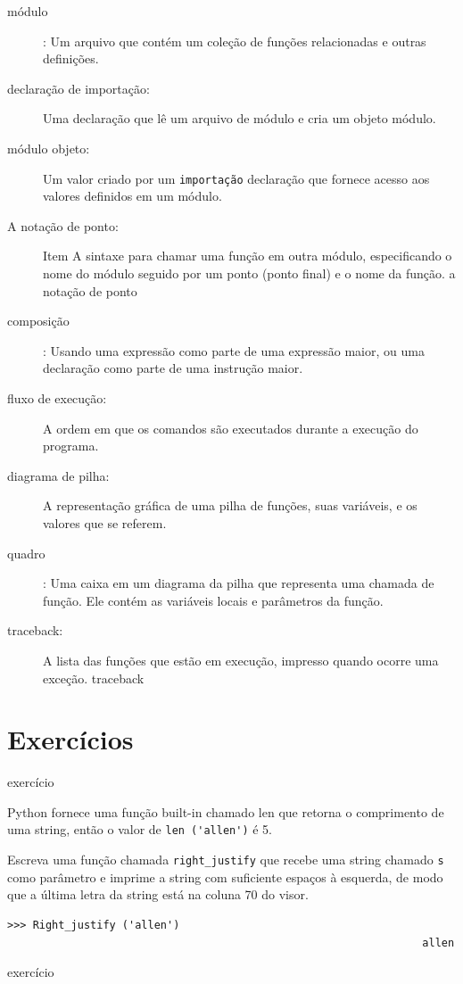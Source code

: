 \documentclass[10pt]{book}
\begin{document}
\begin{description}
\item[módulo]: Um arquivo que contém um
coleção de funções relacionadas e outras definições.

\item[declaração de importação:] Uma declaração que lê um arquivo de módulo e cria
um objeto módulo.

\item[módulo objeto:] Um valor criado por um {\tt importação} declaração
que fornece acesso aos valores definidos em um módulo.

\item[A notação de ponto:] Item A sintaxe para chamar uma função em outra
módulo, especificando o nome do módulo seguido por um ponto (ponto final) e
o nome da função.
\index{} a notação de ponto

\item[composição]: Usando uma expressão como parte de uma expressão maior,
ou uma declaração como parte de uma instrução maior.

\item[fluxo de execução:] A ordem em que os comandos são executados durante
a execução do programa.

\item[diagrama de pilha:] A representação gráfica de uma pilha de funções,
suas variáveis, e os valores que se referem.

\item[quadro]: Uma caixa em um diagrama da pilha que representa uma chamada de função.
Ele contém as variáveis ​​locais e parâmetros da função.

\item[traceback:] A lista das funções que estão em execução,
impresso quando ocorre uma exceção.
\index{} traceback


\end{description}


\section{Exercícios}

\begin{} exercício

Python fornece uma função built-in chamado {len \tt} que
retorna o comprimento de uma string, então o valor de \verb "len ('allen')" é 5.

Escreva uma função chamada \verb "right_justify" que recebe uma string
chamado {\tt s} como parâmetro e imprime a string com suficiente
espaços à esquerda, de modo que a última letra da string está na coluna 70
do visor.

\begin{verbatim}
>>> Right_justify ('allen')
                                                                 allen
\end{verbatim}

\end{} exercício
\end{document}
